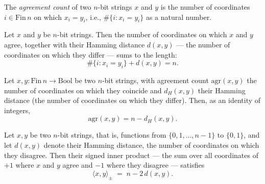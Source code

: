 \begin{definition}
\label{CommunicationComplexity.BitString.agreementCount}
\leanok
{}
The \emph{agreement count} of two $n$-bit strings $x$ and $y$ is the number of
coordinates $i \in \mathrm{Fin}\,n$ on which $x_i = y_i$, i.e.,
$\#\{i : x_i = y_i\}$ as a natural number.
\end{definition}

\begin{theorem}
\label{CommunicationComplexity.BitString.agreementCount_add_hammingDist_eq_length}
\leanok
{}
Let $x$ and $y$ be $n$-bit strings. Then the number of coordinates on which $x$ and $y$
agree, together with their Hamming distance $d(x, y)$ — the number of coordinates on
which they differ — sums to the length:
\[
  \#\{i : x_i = y_i\} + d(x, y) = n.
\]
\end{theorem}

\begin{theorem}
\label{CommunicationComplexity.BitString.agreementCount_eq_length_sub_hammingDist}
\leanok
{}
Let $x, y : \mathrm{Fin}\,n \to \mathrm{Bool}$ be two $n$-bit strings, with agreement
count $\mathrm{agr}(x,y)$ the number of coordinates on which they coincide and
$d_H(x,y)$ their Hamming distance (the number of coordinates on which they differ).
Then, as an identity of integers,
\[
  \mathrm{agr}(x,y) = n - d_H(x,y).
\]
\end{theorem}

\begin{theorem}
\label{CommunicationComplexity.BitString.signedInner_eq_length_sub_twice_hammingDist}
\leanok
{}
Let $x, y$ be two $n$-bit strings, that is, functions from $\{0, 1, \dots, n-1\}$ to
$\{0,1\}$, and let $d(x,y)$ denote their Hamming distance, the number of coordinates on
which they disagree. Then their signed inner product — the sum over all coordinates of
$+1$ where $x$ and $y$ agree and $-1$ where they disagree — satisfies
\[
  \langle x, y\rangle_{\pm} \;=\; n - 2\,d(x, y).
\]
\end{theorem}

